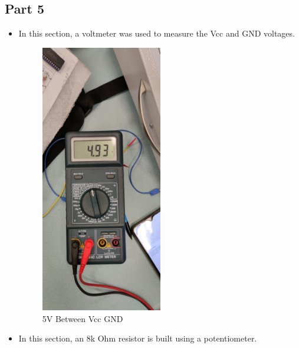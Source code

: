 \documentclass[pdftex,12pt,a4paper]{article}
\begin{document}
\subsection{Part 5}
\begin{itemize}
    \item In this section, a voltmeter was used to measure the Vcc and GND voltages.
    \begin{figure}[H]
	\centering
	\includegraphics[width=0.5\textwidth]{ex5-1.png}
	\caption{5V Between Vcc GND}
	\label{fig5}
\end{figure}
    \vspace{4cm}
    \item In this section, an 8k Ohm resistor is built using a potentiometer.
    \begin{figure}[H]
	\centering

\end{figure}
\end{itemize}
\end{document}

